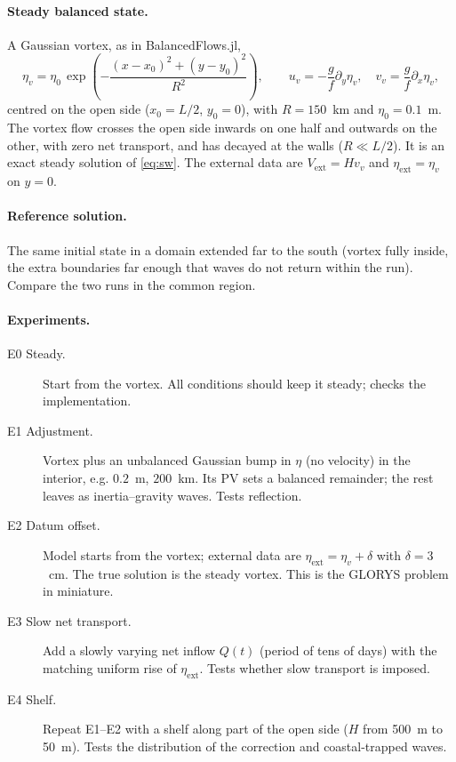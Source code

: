 \documentclass[11pt]{article}
\newcommand{\ext}{\mathrm{ext}}
\begin{document}
\paragraph{Steady balanced state.} A Gaussian vortex, as in BalancedFlows.jl,
\begin{equation}
  \eta_v = \eta_0\,\exp\!\left(-\frac{(x-x_0)^2+(y-y_0)^2}{R^2}\right),\qquad
  u_v = -\frac{g}{f}\partial_y\eta_v,\quad v_v = \frac{g}{f}\partial_x\eta_v,
\end{equation}
centred on the open side ($x_0=L/2$, $y_0=0$), with $R=150$~km and $\eta_0=0.1$~m. The vortex flow crosses the open
side inwards on one half and outwards on the other, with zero net transport, and has decayed at the walls
($R\ll L/2$). It is an exact steady solution of \eqref{eq:sw}. The external data are $V_\ext=Hv_v$ and
$\eta_\ext=\eta_v$ on $y=0$.

\paragraph{Reference solution.} The same initial state in a domain extended far to the south (vortex fully inside,
the extra boundaries far enough that waves do not return within the run). Compare the two runs in the common
region.

\paragraph{Experiments.}
\begin{description}
  \item[E0 Steady.] Start from the vortex. All conditions should keep it steady; checks the implementation.
  \item[E1 Adjustment.] Vortex plus an unbalanced Gaussian bump in $\eta$ (no velocity) in the interior, e.g.
        $0.2$~m, $200$~km. Its PV sets a balanced remainder; the rest leaves as inertia--gravity waves.
        Tests reflection.
  \item[E2 Datum offset.] Model starts from the vortex; external data are $\eta_\ext=\eta_v+\delta$ with
        $\delta=3$~cm. The true solution is the steady vortex. This is the GLORYS problem in miniature.
  \item[E3 Slow net transport.] Add a slowly varying net inflow $Q(t)$ (period of tens of days) with the matching
        uniform rise of $\eta_\ext$. Tests whether slow transport is imposed.
  \item[E4 Shelf.] Repeat E1--E2 with a shelf along part of the open side ($H$ from 500~m to 50~m). Tests the
        distribution of the correction and coastal-trapped waves.
\end{description}
\end{document}
